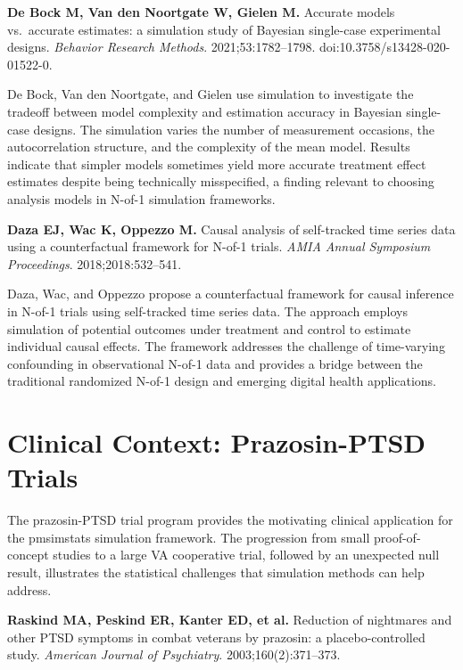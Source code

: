 \documentclass[11pt]{article}
\begin{document}
\medskip
\textbf{De Bock M, Van den Noortgate W, Gielen M.} Accurate
models vs.\ accurate estimates: a simulation study of
Bayesian single-case experimental designs. \textit{Behavior
Research Methods}. 2021;53:1782--1798.
doi:10.3758/s13428-020-01522-0.

\smallskip\noindent
De Bock, Van den Noortgate, and Gielen use simulation to
investigate the tradeoff between model complexity and
estimation accuracy in Bayesian single-case designs. The
simulation varies the number of measurement occasions, the
autocorrelation structure, and the complexity of the
mean model. Results indicate that simpler models sometimes
yield more accurate treatment effect estimates despite
being technically misspecified, a finding relevant to
choosing analysis models in N-of-1 simulation frameworks.

\medskip
\textbf{Daza EJ, Wac K, Oppezzo M.} Causal analysis of
self-tracked time series data using a counterfactual
framework for N-of-1 trials. \textit{AMIA Annual Symposium
Proceedings}. 2018;2018:532--541.

\smallskip\noindent
Daza, Wac, and Oppezzo propose a counterfactual framework
for causal inference in N-of-1 trials using self-tracked
time series data. The approach employs simulation of
potential outcomes under treatment and control to estimate
individual causal effects. The framework addresses the
challenge of time-varying confounding in observational
N-of-1 data and provides a bridge between the traditional
randomized N-of-1 design and emerging digital health
applications.

\section{Clinical Context: Prazosin-PTSD Trials}

The prazosin-PTSD trial program provides the motivating
clinical application for the pmsimstats simulation
framework. The progression from small proof-of-concept
studies to a large VA cooperative trial, followed by an
unexpected null result, illustrates the statistical
challenges that simulation methods can help address.

\medskip
\textbf{Raskind MA, Peskind ER, Kanter ED, et al.}
Reduction of nightmares and other PTSD symptoms in combat
veterans by prazosin: a placebo-controlled study.
\textit{American Journal of Psychiatry}.
2003;160(2):371--373.
\end{document}
